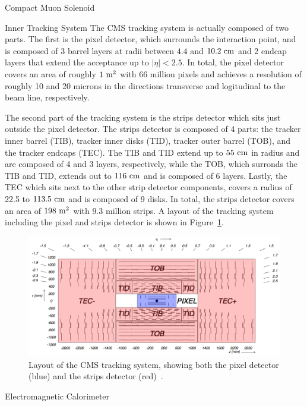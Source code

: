 \begin{section}{Compact Muon Solenoid}
\begin{subsection}{Inner Tracking System}
The CMS tracking system is actually composed of two parts.
The first is the pixel detector, which surrounds the interaction point, and is composed of 3 barrel layers at radii between $4.4$ and $10.2~\mathrm{cm}$ and 2 endcap layers that extend the acceptance up to $|\eta| < 2.5$.
In total, the pixel detector covers an area of roughly $1~\mathrm{m}^2$ with 66 million pixels and achieves a resolution of roughly 10 and 20 microns in the directions transverse and logitudinal to the beam line, respectively.

The second part of the tracking system is the strips detector which sits just outside the pixel detector.
The strips detector is composed of 4 parts: the tracker inner barrel (TIB), tracker inner disks (TID), tracker outer barrel (TOB), and the tracker endcaps (TEC).
The TIB and TID extend up to $55~\mathrm{cm}$ in radius and are composed of 4 and 3 layers, respectively, while the TOB, which surronds the TIB and TID, extends out to $116~\mathrm{cm}$ and is composed of 6 layers.
Lastly, the TEC which sits next to the other strip detector components, covers a radius of 22.5 to $113.5~\mathrm{cm}$ and is composed of 9 disks.
In total, the strips detector covers an area of $198~\mathrm{m}^2$ with 9.3 million strips.
A layout of the tracking system including the pixel and strips detector is shown in Figure~\ref{fig:cms_tracker}.

\begin{figure}[tbp!]
\begin{center}
\includegraphics[angle=0,width=0.80\columnwidth]{fig/cms_tracker.png}
\end{center}
\caption{Layout of the CMS tracking system, showing both the pixel detector (blue) and the strips detector (red)~\cite{Lenzi:2013xpa}.}
\label{fig:cms_tracker}
\end{figure}

\end{subsection}

\begin{subsection}{Electromagnetic Calorimeter}


\end{subsection}
\end{section}
